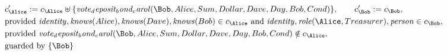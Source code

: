 \begin{align*}
&
c'_
{
\Alice
}
 := 
c_
{
\Alice
}
 \uplus 
\{
\mathit{
vote_deposit_bond_carol
}
(
\Bob
,
Alice
,
Sum
,
Dollar
,
Dave
,
Day
,
Bob
,
Cond
)
\}
, \qquad 
c'_
{
\Bob
}
 := 
c_
{
\Bob
}
,\\
&
\text{provided } 
\mathit{
identity
}
,
\mathit{
knows
}
(
Alice
)
,
\mathit{
knows
}
(
Dave
)
,
\mathit{
knows
}
(
Bob
)
 \in c_
{
\Alice
}
 \text{ and } 
\mathit{
identity
}
,
\mathit{
role
}
(
\Alice
,
Treasurer
)
,
\mathit{
person
}
 \in c_
{
\Bob
}
,\\
&
\text{provided } 
\mathit{
vote_deposit_bond_carol
}
(
\Bob
,
Alice
,
Sum
,
Dollar
,
Dave
,
Day
,
Bob
,
Cond
)
 \notin c_
{
\Alice
}
,\\
&
\text{guarded by } \{
\Bob
\}
\end{align*}


